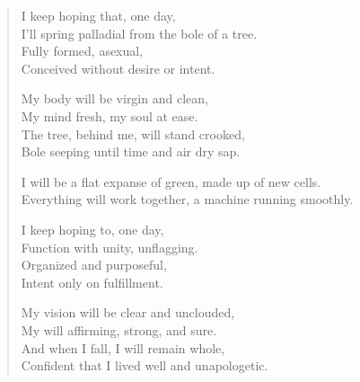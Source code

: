 \documentclass[12pt,letterpaper,oneside]{memoir}
\begin{document}
  \pagestyle{empty}
  \begin{verse}
    I keep hoping that, one day,\\
    I'll spring palladial from the bole of a tree.\\
    Fully formed, asexual,\\
    Conceived without desire or intent.

    My body will be virgin and clean,\\
    My mind fresh, my soul at ease.\\
    The tree, behind me, will stand crooked,\\
    Bole seeping until time and air dry sap.

    I will be a flat expanse of green, made up of new cells.\\
    Everything will work together, a machine running smoothly.

    I keep hoping to, one day,\\
    Function with unity, unflagging.\\
    Organized and purposeful,\\
    Intent only on fulfillment.

    My vision will be clear and unclouded,\\
    My will affirming, strong, and sure.\\
    And when I fall, I will remain whole,\\
    Confident that I lived well and unapologetic.
  \end{verse}
\end{document}

